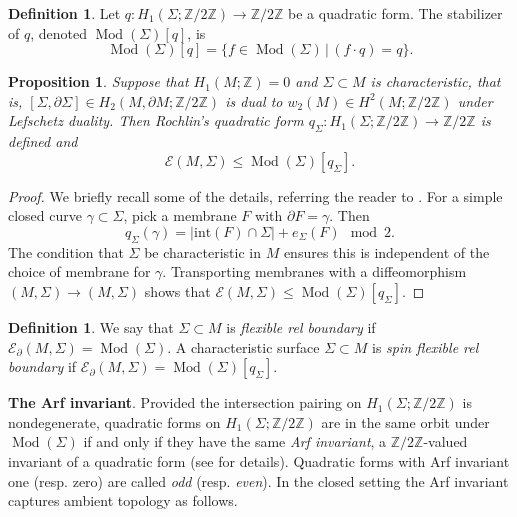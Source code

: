 \documentclass[10pt]{amsart}
\numberwithin{equation}{section}
\theoremstyle{plain}
\newtheorem{proposition}[theorem]{Proposition}
\theoremstyle{definition}
\newtheorem{defn}[theorem]{Definition}
\theoremstyle{remark}
\DeclareMathOperator{\Mod}{Mod}
\begin{document}
\begin{defn}
Let $q : H_1(\Sigma;\mathbb{Z}/2\mathbb{Z}) \to \mathbb{Z}/2\mathbb{Z}$ be a quadratic form. The stabilizer of $q$, denoted $\Mod(\Sigma)[q]$, is
\[ \Mod(\Sigma)[q] = \{f \in \Mod(\Sigma)\,|\, (f\cdot q) = q\}. \]
\end{defn}



\begin{proposition} \label{RochlinsForm}
Suppose that $H_1(M;\mathbb{Z}) = 0$ and  $\Sigma \subset M$ is characteristic, that is, $[\Sigma,\partial\Sigma] \in H_2(M,\partial M;\mathbb{Z}/2\mathbb{Z})$ is dual to $w_2(M) \in H^2(M;\mathbb{Z}/2\mathbb{Z})$ under Lefschetz duality. Then \textit{Rochlin's quadratic form}  $q_{\Sigma} : H_1(\Sigma;\mathbb{Z}/2\mathbb{Z}) \to \mathbb{Z}/2\mathbb{Z}$  is defined and \[\mathcal{E}(M,\Sigma) \leq \Mod(\Sigma)[q_{\Sigma}].\]
\end{proposition}

\begin{proof}
We briefly recall some of the details, referring the reader to \cite[Lemma 2]{Klug}. For a simple closed curve $\gamma \subset \Sigma$, pick a membrane $F$ with $\partial F = \gamma$. Then \[q_{\Sigma}(\gamma) = |\textrm{int}(F) \cap \Sigma| + e_{\Sigma}(F) \mod 2.\] The condition that $\Sigma$ be characteristic in $M$ ensures this is independent of the choice of membrane for $\gamma$. Transporting membranes with a diffeomorphism $(M,\Sigma) \to (M,\Sigma)$ shows that $\mathcal{E}(M,\Sigma) \leq \Mod(\Sigma)[q_{\Sigma}]$.
\end{proof}


\begin{defn}
We say that $\Sigma \subset M$ is \textit{flexible rel boundary} if $\mathcal{E}_{\partial}(M,\Sigma) = \Mod(\Sigma)$. A characteristic surface $\Sigma \subset M$ is  \textit{spin flexible rel boundary} if $\mathcal{E}_{\partial}(M,\Sigma) = \Mod(\Sigma)[q_\Sigma]$.
\end{defn}


\textbf{The Arf invariant}. Provided the intersection pairing on $H_1(\Sigma;\mathbb{Z}/2\mathbb{Z})$ is nondegenerate, quadratic forms on $H_1(\Sigma;\mathbb{Z}/2\mathbb{Z})$ are in the same orbit under $\Mod(\Sigma)$ if and only if they have the same \textit{Arf invariant}, a $\mathbb{Z}/2\mathbb{Z}$-valued invariant of a quadratic form (see \cite{Randal-Williams} for details). Quadratic forms with Arf invariant one (resp. zero) are called \textit{odd} (resp. \textit{even}). In the closed setting the Arf invariant captures ambient topology as follows. 
\end{document}
